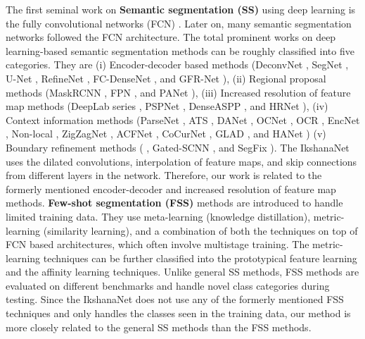 \documentclass{article}
\begin{document}
The first seminal work on \textbf{Semantic segmentation (SS)} using deep learning is the fully convolutional networks (FCN) \cite{long2015fully}. Later on, many semantic segmentation networks followed the FCN \cite{long2015fully} architecture. The total prominent works on deep learning-based semantic segmentation methods can be roughly classified into five categories.  They are (i) Encoder-decoder based methods (DeconvNet \cite{noh2015learning}, SegNet \cite{badrinarayanan2017segnet}, U-Net \cite{ronneberger2015u}, RefineNet \cite{Lin:2017:RefineNet,lin2019refinenet}, FC-DenseNet \cite{fc-densenet}, and GFR-Net \cite{islamsal18}), (ii) Regional proposal methods (MaskRCNN \cite{he2017mask}, FPN \cite{lin2017feature}, and PANet \cite{liu2018path}), (iii) Increased resolution of feature map methods (DeepLab series \cite{ChenPKMY14,7913730,ChenPSA17,chen2018encoder}, PSPNet \cite{zhao2017pyramid}, DenseASPP \cite{8578486}, and HRNet \cite{SunXLW19}), (iv) Context information methods (ParseNet \cite{LiuRB15}, ATS \cite{7780765}, DANet \cite{fu2019dual}, OCNet \cite{abs-1809-00916}, OCR \cite{10.1007/978-3-030-58539-6_11}, EncNet \cite{Zhang_2018_CVPR}, Non-local \cite{8578911}, ZigZagNet \cite{8954370}, ACFNet \cite{9010415}, CoCurNet \cite{8954430}, GLAD \cite{xi}, and HANet \cite{choi2020cars}) (v) Boundary refinement methods ( \cite{Bertasius_2015_ICCV,CB2016Semantic,Ding_2019_ICCV,MarinHVCTYB19}, Gated-SCNN \cite{takikawa2019gated}, and SegFix \cite{yuan2020segfix}).
The IkshanaNet uses the dilated convolutions, interpolation of feature maps, and skip connections from different layers in the network. Therefore, our work is related to the formerly mentioned encoder-decoder and increased resolution of feature map methods.\newline
\textbf{Few-shot segmentation (FSS)} methods \cite{xu2016deep,dong2018few,RakellySDEL18,2009-06680,TianWQWSG20,BMVC2017_167,9108530,Wang_2019_ICCV,Zhang_2019_CVPR,WangZHYCZ20,Zhang_2019_ICCV,YangLLJY20,GFSS,meta-seg,Dyanamic-Extension-GFSS} are introduced to handle limited training data. They use meta-learning (knowledge distillation), metric-learning (similarity learning), and a combination of both the techniques on top of FCN \cite{long2015fully} based architectures, which often involve multistage training. The metric-learning techniques can be further classified into the prototypical feature learning \cite{dong2018few,priorFSS,Wang_2019_ICCV,Zhang_2019_CVPR,9108530,ASGNet} and the affinity learning \cite{WangZHYCZ20,Zhang_2019_ICCV,YangWZCYOZ20} techniques. Unlike general SS methods, FSS methods are evaluated on different benchmarks and handle novel class categories during testing.
Since the IkshanaNet does not use any of the formerly mentioned FSS techniques and only handles the classes seen in the training data, our method is more closely related to the general SS methods than the FSS methods.
\end{document}
